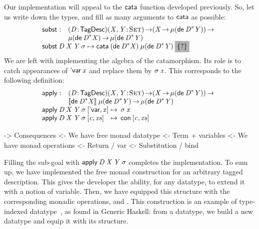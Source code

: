 \newcommand{\subst}{\F{subst}}
\newcommand{\apply}{\F{apply}}

Our implementation will appeal to the $\cata$ function developed
previously. So, let us write down the types, and fill as many
arguments to $\cata$ as possible:
%
\[\stk{
\begin{array}{@{}ll}
\subst : & \PITEL{\V{D}}{\TagDesc}
           \PI{\V{X}, \V{Y}}{\Set} 
           (\V{X} \To \Mu{(\toDesc{\FreeMonad{\V{D}}{\V{Y}}})}) \To \\
         & \Mu{(\toDesc{\FreeMonad{\V{D}}{\V{X}}})} \To
           \Mu{(\toDesc{\FreeMonad{\V{D}}{\V{Y}}})} 
\end{array} \\
\subst\: \V{D}\: \V{X}\: \V{Y}\: \V{\sigma} \mapsto
  \cata\: (\toDesc{\FreeMonad{\V{D}}{\V{X}}})\: 
          \Mu{(\toDesc{\FreeMonad{\V{D}}{\V{Y}}})}\: 
          \SHED
}\]
%
We are left with implementing the algebra of the catamorphism. Its
role is to catch appearances of $\DVar{\V{x}}$ and replace them by
$\V{\sigma}\: \V{x}$. This corresponds to the following definition:
%
\[\stk{
\begin{array}{@{}ll}
\apply : & \PITEL{\V{D}}{\TagDesc} 
           \PI{\V{X}, \V{Y}}{\Set} 
           (\V{X} \To \Mu{(\toDesc{\FreeMonad{\V{D}}{\V{Y}}})}) \To \\
         & \descop{\toDesc{\FreeMonad{\V{D}}{\V{X}}}}{\Mu{(\toDesc{\FreeMonad{\V{D}}{\V{Y}}})}} \To
           \Mu{(\toDesc{\FreeMonad{\V{D}}{\V{Y}}})}
\\
\end{array} \\
\begin{array}{@{}l@{\:\mapsto\:\:}l}
\apply\: \V{D}\: \V{X}\: \V{Y}\: \V{\sigma}\: \pair{\SYMBDVar}{\V{x}}{}   & \V{\sigma}\: \V{x}                   \\
\apply\: \V{D}\: \V{X}\: \V{Y}\: \V{\sigma}\: \pair{\V{c}}{\V{xs}}{} & \Con{\pair{\V{c}}{\V{xs}}{}}
\end{array}
}\]

\begin{wstructure}
    -> Consequences
        <- We have free monad datatype
            <- Term + variables
        <- We have monad operations
            <- Return / var
            <- Substitution / bind
\end{wstructure}

Filling the sub-goal with $\apply\: \V{D}\: \V{X}\: \V{Y}\:
\V{\sigma}$ completes the implementation. To sum up, we have
implemented the free monad construction for an arbitrary tagged
description. This gives the developer the ability, for any datatype,
to extend it with a notion of variable. Then, we have equipped this
structure with the corresponding monadic operations, \bind and
\return. This construction is an example of type-indexed
datatype~\cite{hinze:generic-haskell}, as found in Generic Haskell:
from a datatype, we build a new datatype and equip it with its
structure.

